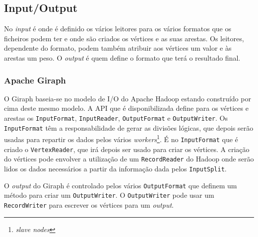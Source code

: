 \subsection{Input/Output}
No \textit{input} é onde é definido os vários leitores para os vários formatos que os ficheiros podem ter e onde são criados os vértices e as suas arestas. Os leitores, dependente do formato, podem também atribuir aos vértices um valor e às arestas um peso.
O \textit{output} é quem define	 o formato que terá o resultado final.
\subsubsection*{Apache Giraph}
O Giraph baseia-se no modelo de I/O do Apache Hadoop estando construído por cima deste mesmo modelo.
A API que é disponibilizada define para os vértices e arestas os \texttt{InputFormat}, \texttt{InputReader}, \texttt{OutputFormat} e \texttt{OutputWriter}.
Os \texttt{InputFormat} têm a responsabilidade de gerar as divisões lógicas, que depois serão usadas para repartir os dados pelos vários
\textit{workers}\footnote{\textit{slave nodes}}. É no \texttt{InputFormat} que é criado o \texttt{VertexReader}, que irá depois ser usado para criar os vértices.
A criação do vértices pode envolver a utilização de um \texttt{RecordReader} do Hadoop onde serão lidos os dados necessários a partir da informação dada pelos \texttt{InputSplit}.

O \textit{output} do Giraph é controlado pelos vários \texttt{OutputFormat} que definem um método para criar um \texttt{OutputWriter}. O \texttt{OutputWriter} pode usar um \texttt{RecordWriter}
para escrever os vértices para um \textit{output}.

